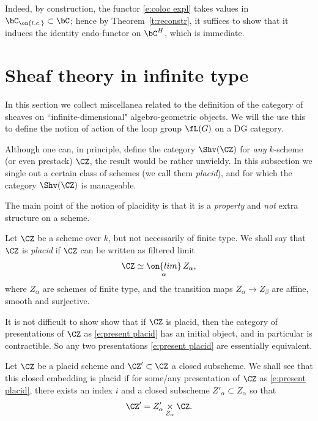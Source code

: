 \documentclass[9pt]{amsart}
\theoremstyle{definition}
\theoremstyle{remark}
\newcommand{\thmref}[1]{Theorem~\ref{#1}}
\numberwithin{equation}{section}
\begin{document}
Indeed, by construction, the functor \eqref{e:coloc expl} takes values in $\bC_{\on{l.c.}}\subset \bC$; hence
by \thmref{t:reconstr}, it suffices to show that it induces the identity endo-functor on $\bC^H$, which is immediate. 

\section{Sheaf theory in infinite type}  \label{s:placid}

In this section we collect miscellanea related to the definition of the category of sheaves on ``infinite-dimensional"
algebro-geometric objects. We will the use this to define the notion of action of the loop group $\fL(G)$ on a DG
category. 


Although one can, in principle, define the category $\Shv(\CZ)$ for \emph{any} $k$-scheme (or even prestack) $\CZ$,
the result would be rather unwieldy. In this subsection we single out a certain class of schemes (we call them \emph{placid}),
and for which the category $\Shv(\CZ)$ is manageable. 

\medskip

The main point of the notion of placidity is that it is a \emph{property} and \emph{not} extra structure on a scheme. 

\sssec{}

Let $\CZ$ be a scheme over $k$, but not necessarily of finite type. We shall say that $\CZ$ is \emph{placid} if $\CZ$
can be written as filtered limit
\begin{equation} \label{e:present placid}
\CZ\simeq \underset{\alpha}{\on{lim}}\, Z_\alpha,
\end{equation} 
where $Z_\alpha$ are schemes of finite type, and the transition maps $Z_\alpha\to Z_\beta$ are affine, smooth and surjective.

\sssec{}  \label{sss:indep placid}

It is not difficult to show show that if $\CZ$ is placid, then the category of presentations of $\CZ$ as \eqref{e:present placid}
has an initial object, and in particular is contractible. So any two presentations \eqref{e:present placid} are essentially
equivalent.

\sssec{}

Let $\CZ$ be a placid scheme and $\CZ'\subset \CZ$ a closed subscheme. We shall see that this closed embedding
is placid if for some/any presentation of $\CZ$ as \eqref{e:present placid}, there exists an index $i$ and a closed
subscheme $Z'_\alpha\subset Z_\alpha$ so that
$$\CZ'=Z'_\alpha\underset{Z_\alpha}\times \CZ.$$
\end{document}
